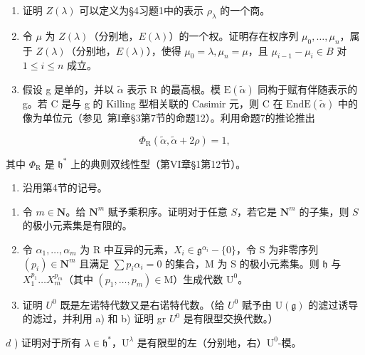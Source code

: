 
\begin{enumerate}
\def\labelenumi{\arabic{enumi})}
\item
  证明 \(Z(\lambda)\) 可以定义为§4习题1中的表示 \(\rho_{\lambda}\) 的一个商。
\item
  令 \(\mu\) 为 \(Z(\lambda)\)（分别地，\(E(\lambda)\)）的一个权。证明存在权序列 \(\mu_0, \ldots, \mu_n\)，属于 \(Z(\lambda)\)（分别地，\(E(\lambda)\)），使得 \(\mu_0 = \lambda, \mu_n = \mu\)，且 \(\mu_{i-1} - \mu_i \in B\) 对 \(1 \leq i \leq n\) 成立。
\item
  假设 g 是单的，并以 \(\tilde{\alpha}\) 表示 R 的最高根。模 \(\mathrm{E}(\tilde{\alpha})\) 同构于赋有伴随表示的 g。若 C 是与 g 的 Killing 型相关联的 Casimir 元，则 C 在 \(\mathrm{End}\mathrm{E}(\tilde{\alpha})\) 中的像为单位元（参见~第I章§3第7节的命题12）。利用命题7的推论推出
\end{enumerate}

\[
\varPhi_ {\mathrm{R}} (\tilde {\alpha}, \tilde {\alpha} + 2 \rho) = 1,
\]

其中 \(\Phi_{\mathrm{R}}\) 是 \(\mathfrak{h}^*\) 上的典则双线性型（第VI章§1第12节）。

\begin{enumerate}
\def\labelenumi{\arabic{enumi})}
\setcounter{enumi}{3}
\tightlist
\item
  沿用第4节的记号。
\end{enumerate}

\begin{enumerate}
\def\labelenumi{\alph{enumi})}
\item
  令 \(m \in \mathbf{N}\)。给 \(\mathbf{N}^m\) 赋予乘积序。证明对于任意 \(S\)，若它是 \(\mathbf{N}^m\) 的子集，则 \(S\) 的极小元素集是有限的。
\item
  令 \(\alpha_{1},\ldots ,\alpha_{m}\) 为 R 中互异的元素，\(X_{i}\in \mathfrak{g}^{\alpha_{i}} - \{0\}\)，令 S 为非零序列 \((p_i)\in \mathbf{N}^m\) 且满足 \(\sum p_i\alpha_i = 0\) 的集合，M 为 S 的极小元素集。则 \(\mathfrak{h}\) 与 \(X_1^{p_1}\dots X_m^{p_m}\)（其中 \((p_1,\dots ,p_m)\in \mathrm{M}\)）生成代数 \(\mathrm{U}^0\)。
\item
  证明 \(U^{0}\) 既是左诺特代数又是右诺特代数。（给 \(U^{0}\) 赋予由 \(\mathrm{U}(\mathfrak{g})\) 的滤过诱导的滤过，并利用 a) 和 b) 证明 gr \(U^{0}\) 是有限型交换代数。）
\end{enumerate}

\(d\) ) 证明对于所有 \(\lambda \in \mathfrak{h}^*\)，\(\mathrm{U}^{\lambda}\) 是有限型的左（分别地，右）\(\mathrm{U}^0\)-模。

